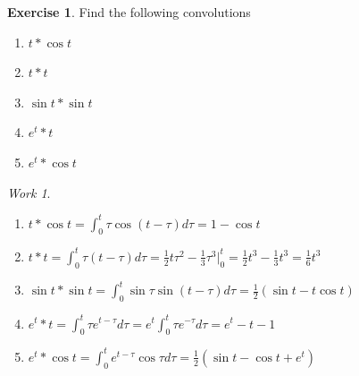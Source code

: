 \documentclass{report}
\theoremstyle{definition}
\newtheorem{exercise}{Exercise}[chapter]
\theoremstyle{remark}
\newtheorem*{work}{Work}
\begin{document}
\begin{exercise}
    Find the following convolutions
    \begin{enumerate}[label=(\alph*)]
        \item $t*\cos t$
        \item $t*t$
        \item $\sin t *\sin t$
        \item $e^t*t$
        \item $e^t*\cos t$
    \end{enumerate}
\end{exercise}
\begin{work}
    \leavevmode
    \begin{enumerate}[label=(\alph*)]
        \item $\displaystyle{t*\cos t} = \int^t_0\tau \cos (t-\tau)d\tau = 1-\cos t$
        \item $\displaystyle{t*t = \int^t_0\tau (t-\tau)d\tau = \frac{1}{2}t\tau^2-\frac{1}{3}\tau^3\Bigg|^t_0 =\frac{1}{2}t^3-\frac{1}{3}t^3=\frac{1}{6}t^3}$
        \item $\displaystyle{\sin t *\sin t=\int^t_0\sin \tau \sin (t-\tau)d\tau = \tfrac{1}{2}(\sin t-t\cos t)}$
        \item $\displaystyle{e^t*t=\int^t_0\tau e^{t-\tau}d\tau =e^t\int^t_0\tau e^{-\tau}d\tau =e^t-t-1}$
        \item $\displaystyle{e^t*\cos t} = \int^t_0e^{t-\tau}\cos \tau d\tau =\tfrac{1}{2}\left(\sin t -\cos t+e^t \right)$
    \end{enumerate}
\end{work}
\end{document}
